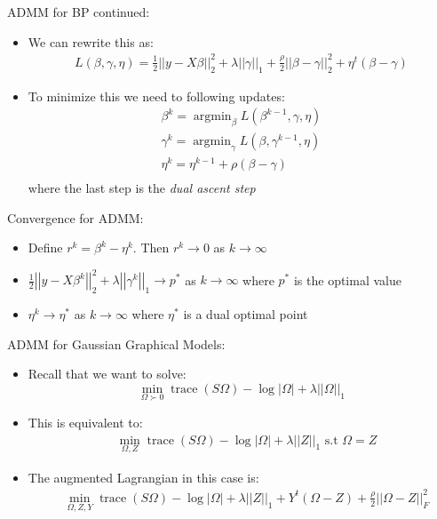 \documentclass[xcolor=dvipsnames,aspectratio=1610]{beamer}
\newcommand{\norm}[1]{\left|\left|#1\right|\right|}
\newcommand{\abs}[1]{\left|#1\right|}
\DeclareMathOperator*{\trace}{trace}
\DeclareMathOperator*{\argmin}{argmin}
\theoremstyle{remark}
\begin{document}
\begin{frame}{ADMM for BP continued:}
  \begin{itemize}
    \setlength{\itemsep}{10pt}
\item We can rewrite this as:
\begin{align*}
L(\beta, \gamma, \eta) = \frac{1}{2}\norm{y- X \beta}_2^2 + \lambda
  \norm{\gamma}_1 + \frac{\rho}{2} \norm{\beta - \gamma}_2^2 + \eta^t(\beta - \gamma)
\end{align*}
\item To minimize this we need to following updates:
\begin{align*}
\beta^{k} = \argmin_\beta L(\beta^{k-1}, \gamma, \eta)\\
\gamma^{k} = \argmin_\gamma L(\beta, \gamma^{k-1}, \eta)\\
\eta^{k} = \eta^{k-1}+ \rho(\beta - \gamma)\\
\end{align*}
where the last step is the \textit{dual ascent step}
  \end{itemize}
\end{frame}

\begin{frame}{Convergence for ADMM:}
  \begin{itemize}
    \setlength{\itemsep}{10pt}
\item Define $r^k = \beta^k - \eta^k$. Then $r^k \to 0$ as $k \to \infty$
\item $\frac{1}{2}\norm{y- X \beta^k}_2^2 + \lambda
  \norm{\gamma^k}_1 \to p^*$ as $k \to \infty$ where $p^*$ is the optimal value 
\item $\eta^k \to \eta^*$ as $k \to \infty$ where $\eta^*$ is a dual optimal point
  \end{itemize}
\end{frame}

\begin{frame}{ADMM for Gaussian Graphical Models:}
  \begin{itemize}
    \setlength{\itemsep}{10pt}
\item Recall that we want to solve:
$$
\min_{\Omega \succ 0} \trace(S\Omega) - \log \abs{\Omega} + \lambda \norm{\Omega}_1
$$
\item This is equivalent to:
\begin{align*}
&\min_{\Omega,Z} \trace(S\Omega) - \log \abs{\Omega} + \lambda \norm{Z}_1 \text{ s.t } \Omega = Z 
\end{align*}
\item The augmented Lagrangian in this case is:
\begin{align*}
&\min_{\Omega,Z,Y} \trace(S\Omega) - \log \abs{\Omega} + \lambda \norm{Z}_1 + Y^t (\Omega - Z) + \frac{\rho}{2} \norm{\Omega-Z}_F^2
\end{align*}
  \end{itemize}
\end{frame}
\end{document}
